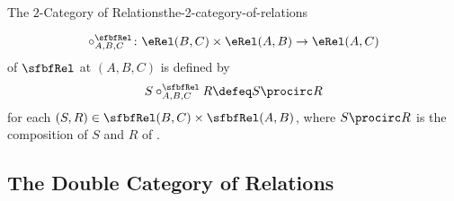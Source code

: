 \begin{definition}{The $2$-Category of Relations}{the-2-category-of-relations}
\begin{itemize}
{                \par\vspace*{-1.75\baselineskip}
            }%
            \[
                \circ^{\sfbfRel}_{A,B,C}%
                \colon%
                \eRel(B,C)%
                \times%
                \eRel(A,B)%
                \to%
                \eRel(A,C)%
            \]%
            of $\sfbfRel$ at $(A,B,C)$ is defined by%
            \[
                S\mathbin{{\circ}^{\sfbfRel}_{A,B,C}}R
                \defeq
                S\procirc R
            \]%
            for each $(S,R)\in\sfbfRel(B,C)\times\sfbfRel(A,B)$, where $S\procirc R$ is the composition of $S$ and $R$ of .
    \end{itemize}
\end{definition}
\subsection{The Double Category of Relations}\label{subsection-the-double-category-of-relations}
